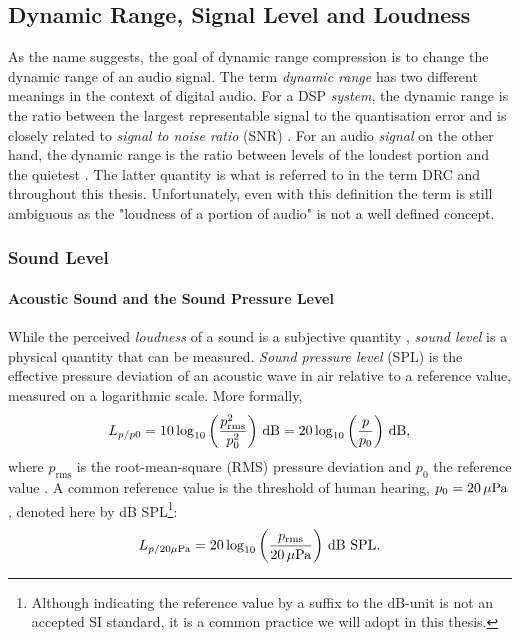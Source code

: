 \documentclass[../main2.tex]{subfiles}
\begin{document}
\subsection{Dynamic Range, Signal Level and Loudness}
As the name suggests, the goal of dynamic range compression is to change the dynamic range of an audio signal. The term \emph{dynamic range} has two different meanings in the context of digital audio. For a DSP \emph{system}, the dynamic range is the ratio between the largest representable signal to the quantisation error and is closely related to \emph{signal to noise ratio} (SNR)  \cite{wilson1993filter}. For an audio \emph{signal} on the other hand, the dynamic range is the ratio between levels of the loudest portion and the quietest \cite{davis1989sound}. The latter quantity is what is referred to in the term DRC and throughout this thesis. Unfortunately, even with this definition the term is still ambiguous as the "loudness of a portion of audio" is not a well defined concept.

\subsubsection{Sound Level}
\paragraph{Acoustic Sound and the Sound Pressure Level}
While the perceived \emph{loudness} of a sound is a subjective quantity \cite{XXXX}, \emph{sound level} is a physical quantity that can be measured. \emph{Sound pressure level} (SPL) is the effective pressure deviation of an acoustic wave in air relative to a reference value, measured on a logarithmic scale. More formally,
\begin{equation}
L_{p/p0} = 10 \log_{10} \left( \frac{p_\text{rms}^2}{p_0^2} \right) \mskip3mu\text{dB} = 20 \log_{10} \left( \frac{p}{p_0} \right) \mskip3mu\text{dB},
\end{equation}
where $p_\text{rms}$ is the root-mean-square (RMS) pressure deviation and $p_0$ the reference value \cite{XXXXX}. A common reference value is the threshold of human hearing, $p_0 = 20 \mskip3mu\mu\text{Pa}$ \cite{XXXX}, denoted here by dB SPL\footnote{Although indicating the reference value by a suffix to the dB-unit is not an accepted SI standard, it is a common practice we will adopt in this thesis.}:
\begin{equation}
L_{p/20 \mu\text{Pa}} = 20 \log_{10} \left( \frac{p_\text{rms}}{20 \mskip3mu\mu\text{Pa}} \right) \mskip3mu\text{dB SPL}.
\end{equation}
\end{document}
